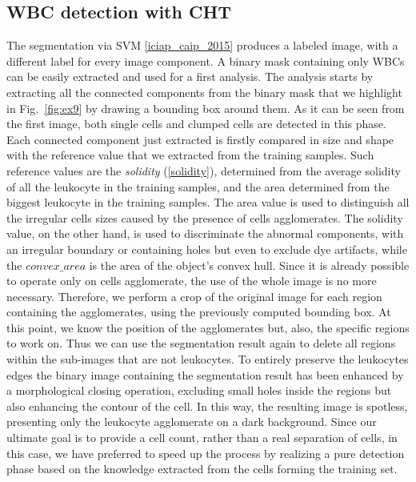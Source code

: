 {	\subsection{WBC detection with CHT}
	The segmentation via SVM \ref{iciap_caip_2015} produces a labeled image, with a different label for every image component. A binary mask containing only WBCs can be easily extracted and used for a first analysis. The analysis starts by extracting all the connected components from the binary mask that we highlight in Fig.~\ref{fig:ex9} by drawing a bounding box around them. As it can be seen from the first image, both single cells and clumped cells are detected in this phase.
	Each connected component just extracted is firstly compared in size and shape with the reference value that we extracted from the training samples. Such reference values are the \textit{solidity} (\ref{solidity}), determined from the average solidity of all the leukocyte in the training samples, and the area determined from the biggest leukocyte in the training samples. The area value is used to distinguish all the irregular cells sizes caused by the presence of cells agglomerates. The solidity value, on the other hand, is used to discriminate the abnormal components, with an irregular boundary or containing holes but even to exclude dye artifacts, while the $convex\_area$ is the area of the object's convex hull. Since it is already possible to operate only on cells agglomerate, the use of the whole image is no more necessary. Therefore, we perform a crop of the original image for each region containing the agglomerates, using the previously computed bounding box. At this point, we know the position of the agglomerates but, also, the specific regions to work on. Thus we can use the segmentation result again to delete all regions within the sub-images that are not leukocytes. 
	To entirely preserve the leukocytes edges the binary image containing the segmentation result has been enhanced by a morphological closing operation, excluding small holes inside the regions but also enhancing the contour of the cell. In this way, the resulting image is spotless, presenting only the leukocyte agglomerate on a dark background. Since our ultimate goal is to provide a cell count, rather than a real separation of cells, in this case, we have preferred to speed up the process by realizing a pure detection phase based on the knowledge extracted from the cells forming the training set. 
}
